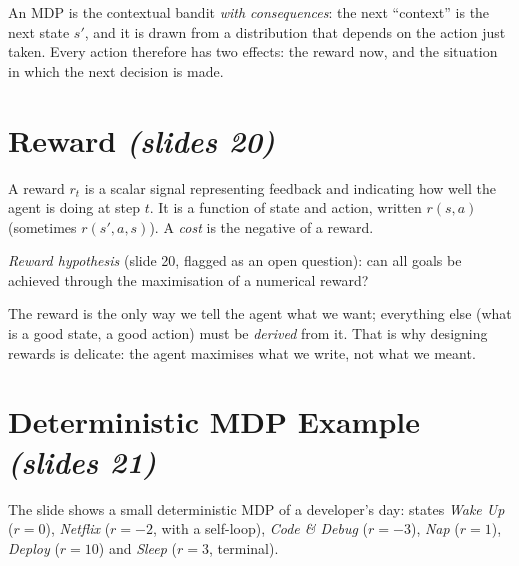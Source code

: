 \documentclass[11pt,a4paper]{article}
\newcommand{\slr}[1]{\texorpdfstring{\emph{(slides #1)}}{(slides #1)}}
\theoremstyle{plain}
\theoremstyle{definition}
\theoremstyle{remark}
\begin{document}
\begin{intuition}
An MDP is the contextual bandit \emph{with consequences}: the next ``context'' is the next state $s'$, and it is drawn from a distribution that depends on the action just taken. Every action therefore has two effects: the reward now, and the situation in which the next decision is made.
\end{intuition}

\section{Reward \slr{20}}
A reward $r_t$ is a scalar signal representing feedback and indicating how well the agent is doing at step $t$. It is a function of state and action, written $r(s,a)$ (sometimes $r(s',a,s)$). A \emph{cost} is the negative of a reward.

\emph{Reward hypothesis} (slide 20, flagged as an open question): can all goals be achieved through the maximisation of a numerical reward?

\begin{intuition}
The reward is the only way we tell the agent what we want; everything else (what is a good state, a good action) must be \emph{derived} from it. That is why designing rewards is delicate: the agent maximises what we write, not what we meant.
\end{intuition}

\section{Deterministic MDP Example \slr{21}}
The slide shows a small deterministic MDP of a developer's day: states \emph{Wake Up} ($r=0$), \emph{Netflix} ($r=-2$, with a self-loop), \emph{Code \& Debug} ($r=-3$), \emph{Nap} ($r=1$), \emph{Deploy} ($r=10$) and \emph{Sleep} ($r=3$, terminal).
\end{document}
